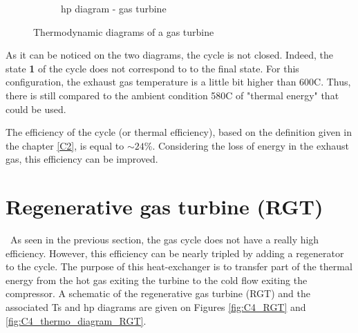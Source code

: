 \begin{figure}[h]
\begin{subfigure}[b]{0.4\textwidth}
         \caption{hp diagram - gas turbine}
         \label{fig:C4_hp_GT}
     \end{subfigure}
        \caption{Thermodynamic diagrams of a gas turbine}
        \label{fig:C4_thermo_diagram_GT}
\end{figure}\newpage


As it can be noticed on the two diagrams, the cycle is not closed. Indeed, the state \textbf{1} of the cycle does not correspond to to the final state. For this configuration, the exhaust gas temperature is a little bit higher than 600\degree C. Thus, there is still compared to the ambient condition 580\degree C of "thermal energy" that could be used.

The efficiency of the cycle (or thermal efficiency), based on the definition given in the chapter \ref{C2}, is equal to $\sim 24$\%. Considering the loss of energy in the exhaust gas, this efficiency can be improved.

\section{Regenerative gas turbine (RGT)}
\quad\, As seen in the previous section, the gas cycle does not have a really high efficiency. However, this efficiency can be nearly tripled by adding a regenerator to the cycle. The purpose of this heat-exchanger is to transfer part of the thermal energy from the hot gas exiting the turbine to the cold flow exiting the compressor. A schematic of the regenerative gas turbine (RGT) and the associated Ts and hp diagrams are given on Figures \ref{fig:C4_RGT} and \ref{fig:C4_thermo_diagram_RGT}. 

